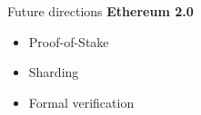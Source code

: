 \begin{frame}{Future directions}
    \textbf{Ethereum 2.0}
    \begin{itemize}
        \item Proof-of-Stake
        \item Sharding
        \item Formal verification
    \end{itemize}
\end{frame}
